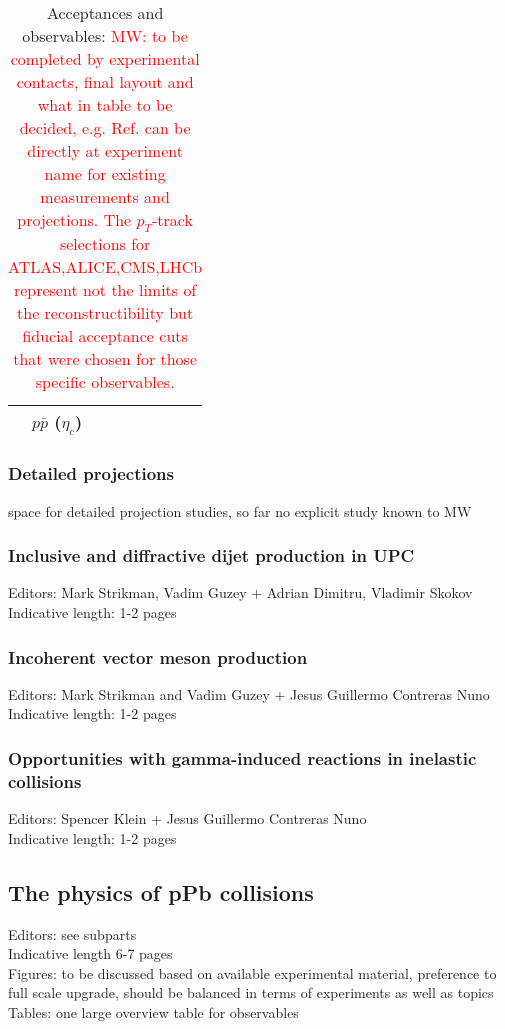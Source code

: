 \documentclass[../report.tex]{subfiles}
\begin{document}
\begin{table}[htbp]
{\begin{tabular}{|c|c|c|c|c|c|c|c|c|}
& $p\bar{p}$ ($\eta_c$)                 &          &                                                                    &                 &                      &        & &    \\
\hline
\end{tabular}
\caption{Acceptances and observables: \textcolor{red}{MW: to be completed by experimental contacts, final layout and what in table to be decided, e.g. Ref. can be directly at experiment name for existing measurements and projections. The $p_T$-track selections for ATLAS,ALICE,CMS,LHCb represent not the limits of the reconstructibility but fiducial acceptance cuts that were chosen for those specific observables.}  }
}
\end{table}

\subsubsection{Detailed projections}
space for detailed projection studies, so far no explicit study known to MW
\subsubsection{Inclusive and diffractive dijet production in UPC}
Editors: Mark Strikman, Vadim Guzey + Adrian Dimitru, Vladimir Skokov\\
Indicative length: 1-2 pages
\subsubsection{Incoherent vector meson production}
Editors: Mark Strikman and Vadim Guzey + Jesus Guillermo Contreras Nuno\\
Indicative length: 1-2 pages
\subsubsection{Opportunities with gamma-induced reactions in inelastic collisions}
Editors: Spencer Klein + Jesus Guillermo Contreras Nuno\\
Indicative length: 1-2 pages  

\subsection{The physics of pPb collisions}
Editors: see subparts\\
Indicative length 6-7 pages\\
Figures: to be discussed based on available experimental material, preference to full scale upgrade, should be balanced in terms of experiments as well as topics\\
Tables: one large overview table for observables
\end{document}
